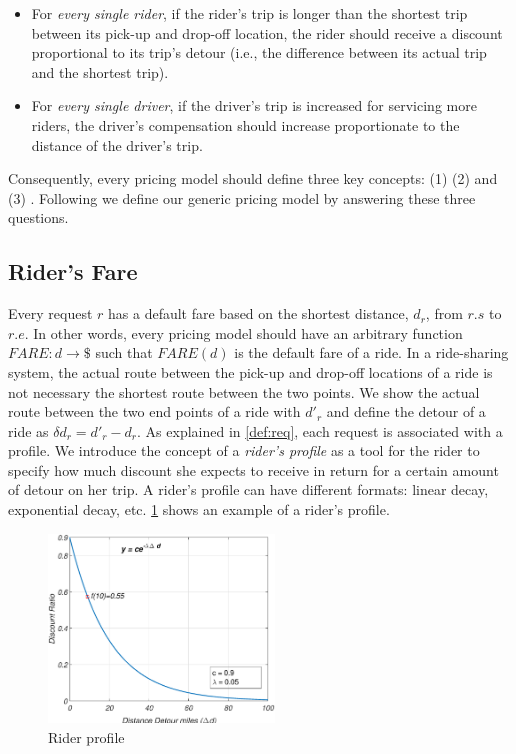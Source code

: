 \begin{itemize}
\item For \textit{every single rider}, if the rider's trip is longer than the shortest trip between its pick-up and drop-off location, the rider should receive a discount proportional to its trip's detour (i.e., the difference between its actual trip and the shortest trip).
\item For \textit{every single driver}, if the driver's trip is increased for servicing more riders, the driver's compensation should increase proportionate to the distance of the driver's trip.
\end{itemize}

Consequently, every pricing model should define three key concepts: (1)  (2)  and (3) . Following we define our generic pricing model by answering these three questions.

\subsection{Rider's Fare}

Every request $r$ has a default fare based on the shortest distance, $d_r$, from $r.s$ to $r.e$. In other words, every pricing model should have an arbitrary function $FARE: d \rightarrow \$ $ such that $FARE(d)$ is the default fare of a ride. In a ride-sharing system, the actual route between the pick-up and drop-off locations of a ride is not necessary the shortest route between the two points. We show the actual route between the two end points of a ride with $d'_r$ and define the detour of a ride as $\delta d_r = d'_r - d_r$. As explained in \cref{def:req}, each request is associated with a profile. We introduce the concept of a \textit{rider's profile} as a tool for the rider to specify how much discount she expects to receive in return for a certain amount of detour on her trip. A rider's profile can have different formats: linear decay, exponential decay, etc. \cref{fig:rider_profile} shows an example of a rider's profile.

\begin{figure}[!ht]
	\centering
	\includegraphics[width = 60mm]{fig/rider.eps}
	\vspace{-0mm}\caption{Rider profile} \vspace{-2mm} \label{fig:rider_profile}
\end{figure}\vspace{-0mm}

